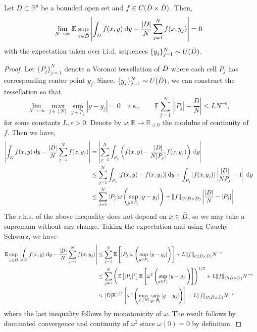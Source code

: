 \documentclass[twoside]{article}
\newcommand{\1}{\mathbbm{1}}
\newcommand{\R}{\mathbbm{R}}
\providecommand{\mathbbm}{\mathbb} %
\newcommand{\E}{\mathbb{E}}
\begin{document}
\iffalse
\begin{lemma}
\label{lemma:expectation_of_sup}
Let \(D \subset \R^d\) be a bounded open set and \(f \in C(\Bar{D} \times \Bar{D})\).
Then,
\[ \lim_{N \to \infty} \E \sup_{x \in \Bar{D}} \left | \int_D f(x,y) \: \mathrm{d}y - \frac{|D|}{N} \sum_{j=1}^N f(x,y_j) \right |= 0\]
with the expectation taken over i.i.d. sequences \(\{y_j\}_{j=1}^N \sim U(\Bar{D})\).
\end{lemma}
\begin{proof}
Let \(\{P_j\}_{j=1}^N\) denote a Voronoi tessellation of \(\Bar{D}\) where each cell \(P_j\) has corresponding center point \(y_j\).
Since, \(\{y_j\}_{j=1}^N \sim U(\Bar{D})\), we can construct the tessellation so that
\[\lim_{N \to \infty} \max_{j \in [N]} \sup_{y \in P_j} |y - y_j| = 0 \quad \text{a.s.}, \qquad \E \sum_{j=1}^N \left | |P_j| - \frac{D}{N} \right | \leq L N^{-\epsilon},\]
for some constants \(L, \epsilon > 0\).
Denote by \(\omega : \R \to \R_{\geq 0}\) the modulus of continuity of \(f\). Then we have,
\begin{align*}
\left | \int_D f(x,y) \: \mathrm{d}y - \frac{|D|}{N} \sum_{j=1}^N f(x,y_j) \right | &= \left | \sum_{j=1}^N \int_{P_j} \left ( f(x,y) - \frac{|D|}{N|P_j|} f(x,y_j) \right ) \: \mathrm{d}y \right | \\
&\leq \sum_{j=1}^N \int_{P_j} |f(x,y) - f(x,y_j)| \: \mathrm{d}y + \int_{P_j} |f(x,y_j)|  \left | \frac{|D|}{N P_j} - 1 \right | \: \mathrm{d}y \\
&\leq \sum_{j=1}^N |P_j| \omega \left( \sup_{y \in P_j} |y-y_j| \right ) + \|f\|_{C(\Bar{D} \times \Bar{D})} \left | \frac{|D|}{N} - |P_j| \right | 
\end{align*}
The r.h.s. of the above inequality does not depend on \(x \in \Bar{D}\), so we may take a supremum without any change.
Taking the expectation and using Cauchy–Schwarz, we have
\begin{align*}
\E \sup_{x \in \Bar{D}} \left | \int_D f(x,y) \: \mathrm{d}y - \frac{|D|}{N} \sum_{j=1}^N f(x,y_j) \right | &\leq \sum_{j=1}^N \E \left [ |P_j| \omega \left( \sup_{y \in P_j} |y-y_j| \right ) \right ] + L \|f\|_{C(\Bar{D} \times \Bar{D})} N^{-\epsilon} \\
&\leq \sum_{j=1}^N \left ( \E \left [ |P_j|^2 \right ] \E \left [ \omega^2 \left( \sup_{y \in P_j} |y-y_j| \right )  \right ] \right  )^{1/2} + L \|f\|_{C(\Bar{D} \times \Bar{D})} N^{-\epsilon}  \\
&\leq |D| \E^{1/2} \left [ \omega^2 \left( \max_{j \in [N]}\sup_{y \in P_j} |y-y_j| \right )  \right ] + L \|f\|_{C(\Bar{D} \times \Bar{D})} N^{-\epsilon} 
\end{align*}
where the last inequality follows by monotonicity of \(\omega\).
The result follows by dominated convergence and continuity of \(\omega^2\) since \(\omega(0)=0\) by definition.
\end{proof}
\end{document}
